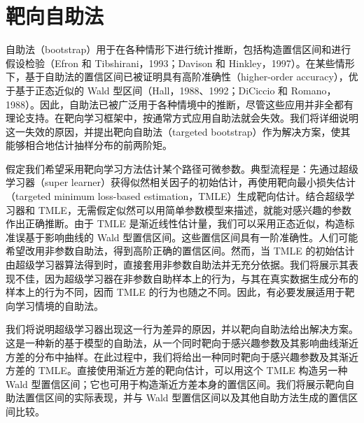 \chapter{靶向自助法}
\label{ch:targeted-bootstrap}

\begin{sourcebox}
自助法（bootstrap）用于在各种情形下进行统计推断，包括构造置信区间和进行假设检验（Efron 和 Tibshirani，1993；Davison 和 Hinkley，1997）。在某些情形下，基于自助法的置信区间已被证明具有高阶准确性（higher-order accuracy），优于基于正态近似的 Wald 型区间（Hall，1988、1992；DiCiccio 和 Romano，1988）。因此，自助法已被广泛用于各种情境中的推断，尽管这些应用并非全都有理论支持。在靶向学习框架中，按通常方式应用自助法就会失效。我们将详细说明这一失效的原因，并提出靶向自助法（targeted bootstrap）作为解决方案，使其能够相合地估计抽样分布的前两阶矩。
\end{sourcebox}

假定我们希望采用靶向学习方法估计某个路径可微参数。典型流程是：先通过超级学习器（super learner）获得似然相关因子的初始估计，再使用靶向最小损失估计（targeted minimum loss-based estimation，TMLE）生成靶向估计。结合超级学习器和 TMLE，无需假定似然可以用简单参数模型来描述，就能对感兴趣的参数作出正确推断。由于 TMLE 是渐近线性估计量，我们可以采用正态近似，构造标准误基于影响曲线的 Wald 型置信区间。这些置信区间具有一阶准确性。人们可能希望改用非参数自助法，得到高阶正确的置信区间。然而，当 TMLE 的初始估计由超级学习器算法得到时，直接套用非参数自助法并无充分依据。我们将展示其表现不佳，因为超级学习器在非参数自助样本上的行为，与其在真实数据生成分布的样本上的行为不同，因而 TMLE 的行为也随之不同。因此，有必要发展适用于靶向学习情境的自助法。

我们将说明超级学习器出现这一行为差异的原因，并以靶向自助法给出解决方案。这是一种新的基于模型的自助法，从一个同时靶向于感兴趣参数及其影响曲线渐近方差的分布中抽样。在此过程中，我们将给出一种同时靶向于感兴趣参数及其渐近方差的 TMLE。直接使用渐近方差的靶向估计，可以用这个 TMLE 构造另一种 Wald 型置信区间；它也可用于构造渐近方差本身的置信区间。我们将展示靶向自助法置信区间的实际表现，并与 Wald 型置信区间以及其他自助方法生成的置信区间比较。

